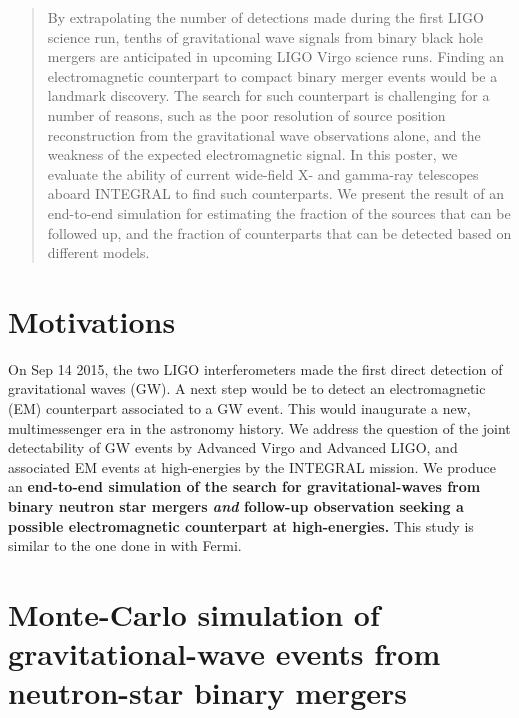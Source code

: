 \documentclass[a0,portrait]{a0poster}
\renewcommand{\emph}[1]{\textbf{\color{blue}#1}}
\begin{document}
\begin{multicols}{2} %


 \begin{abstract}
   By extrapolating the number of detections made during the first
   LIGO science run, tenths of gravitational wave signals from binary
   black hole mergers are anticipated in upcoming LIGO Virgo science
   runs. Finding an electromagnetic counterpart to compact binary
   merger events would be a landmark discovery. The search for such
   counterpart is challenging for a number of reasons, such as the
   poor resolution of source position reconstruction from the
   gravitational wave observations alone, and the weakness of the
   expected electromagnetic signal. In this poster, we evaluate the
   ability of current wide-field X- and gamma-ray telescopes aboard
   INTEGRAL to find such counterparts. We present the result of an
   end-to-end simulation for estimating the fraction of the sources
   that can be followed up, and the fraction of counterparts that can
   be detected based on different models.
 \end{abstract}


\section*{Motivations}

On Sep 14 2015, the two LIGO interferometers made the first direct detection of
gravitational waves (GW). A next step would be to detect an electromagnetic (EM)
counterpart associated to a GW event. This would inaugurate a new,
multimessenger era in the astronomy history. We address the question of the
joint detectability of GW events by Advanced Virgo and Advanced LIGO, and
associated EM events at high-energies by the INTEGRAL mission. We produce an
\emph{end-to-end simulation of the search for gravitational-waves from binary
  neutron star mergers \textit{and} follow-up observation seeking a possible
  electromagnetic counterpart at high-energies.} This study is similar to the
one done in \cite{2016arXiv160606124P} with Fermi.

\section*{Monte-Carlo simulation of gravitational-wave events from neutron-star binary mergers}


\end{multicols}
\end{document}
